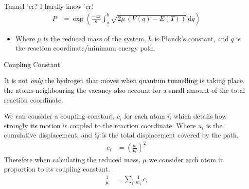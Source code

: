 \documentclass[final]{beamer}
\renewcommand{\d}{\textrm{d}}
\newlength{\colwidth}
\begin{document}
\begin{frame}[t]
\begin{columns}[t]
\begin{column}{\colwidth}
\begin{block}{Tunnel 'er? I hardly know 'er!}
    \begin{align*}        
        P &= \exp \left(\frac{-4\pi}{h}\int_a^b \sqrt{2\mu\,(V(q)-E(T))}\,{\d}q\right)
    \end{align*}
    \begin{itemize}
        \item Where $\mu$ is the reduced mass of the system, $h$ is Planck's constant, and $q$ is the reaction coordinate/minimum energy path.
    \end{itemize}

    \end{block}
    \begin{block}{Coupling Constant}
        
    It is not \emph{only} the hydrogen that moves when quantum tunnelling is taking place, the atoms neighbouring the vacancy also account for a small amount of the total reaction coordinate.

    We can consider a coupling constant, $c_i$ for each atom $i$, which details how strongly its motion is coupled to the reaction coordinate. Where $u_i$ is the cumulative displacement, and $Q$ is the total displacement covered by the path.
    \begin{align*}
        c_i &= \left(\frac{u_i}{Q}\right)^2
    \end{align*}
    \textrm{Therefore when calculating the reduced mass, $\mu$ we consider each atom in proportion to its coupling constant.}
    \begin{align*}
        \frac{1}{\mu} &= \sum_i \frac{1}{m_i}\,c_i
    \end{align*}

  \end{block}


\end{column}
\end{columns}
\end{frame}
\end{document}
